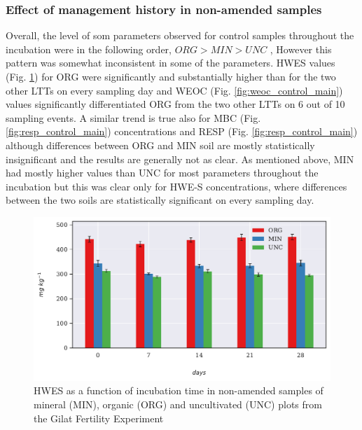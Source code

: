 		\subsubsection{Effect of management history in non-amended samples}

			Overall, the level of \gls{som} parameters observed for control samples throughout the incubation were in the following order, $ ORG  >  MIN  >  UNC $  , However this pattern was somewhat inconsistent in some of the parameters. HWES values (Fig. \ref{fig:hwes_control_main}) for ORG were significantly and substantially higher than for the two other LTTs on every sampling day and WEOC (Fig. \ref{fig:weoc_control_main}) values significantly differentiated ORG from the two other LTTs on 6 out of 10 sampling events. A similar trend is true also for MBC (Fig. \ref{fig:resp_control_main}) concentrations and RESP (Fig. \ref{fig:resp_control_main}) although differences between ORG and MIN soil  are mostly statistically insignificant and the results are generally not as clear. As mentioned above, MIN had mostly higher values than UNC for most parameters throughout the incubation but this was clear only for HWE-S concentrations, where differences between the two soils are statistically significant on every sampling day.

			\begin{figure}[H]
				\centering
				\includegraphics[scale=0.8, width=\linewidth]{thesis_figures/main_incubation/control/HWES.pdf}
				\caption{HWES as a function of incubation time in non-amended samples of mineral (MIN), organic (ORG) and uncultivated (UNC) plots from the Gilat Fertility Experiment}
				\label{fig:hwes_control_main}
			\end{figure}

